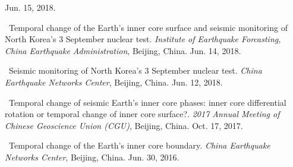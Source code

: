 \begin{etaremune}
    Jun. 15, 2018.
    \invited
\item
    \Yao\
    Temporal change of the Earth’s inner core surface and seismic monitoring of North Korea’s 3 September nuclear test.
    \textit{Institute of Earthquake Forcasting, China Earthquake Administration}, Beijing, China.
    Jun. 14, 2018.
\item
    \Yao\
    Seismic monitoring of North Korea’s 3 September nuclear test.
    \textit{China Earthquake Networks Center}, Beijing, China.
    Jun. 12, 2018.
\item
    \Yao\
    Temporal change of seismic Earth’s inner core phases: inner core differential rotation or temporal change of inner core surface?.
    \textit{2017 Annual Meeting of Chinese Geoscience Union (CGU)}, Beijing, China.
    Oct. 17, 2017.
    \invited
\item
    \Yao\
    Temporal change of the Earth’s inner core boundary.
    \textit{China Earthquake Networks Center}, Beijing, China.
    Jun. 30, 2016.
    \invited
\end{etaremune}
